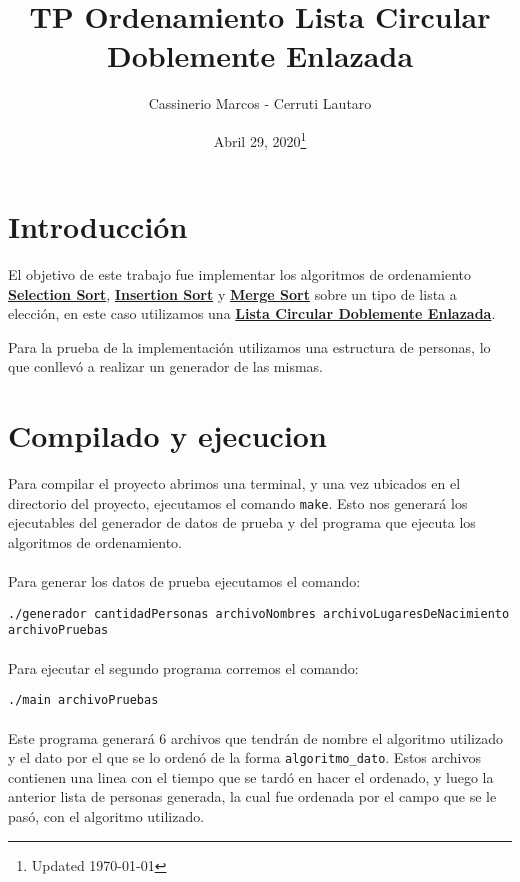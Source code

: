 \documentclass[]{article}
\begin{document}
	
\title{TP Ordenamiento Lista Circular Doblemente Enlazada}
\author{Cassinerio Marcos - Cerruti Lautaro}
\date{Abril 29, 2020\footnote{Updated \today}}
\maketitle
\newpage

\section{Introducción}
El objetivo de este trabajo fue implementar los algoritmos de ordenamiento \href{https://en.wikipedia.org/wiki/Selection_sort}{\textbf{Selection Sort}}, \href{https://en.wikipedia.org/wiki/Insertion_sort}{\textbf{Insertion Sort}} y \href{https://en.wikipedia.org/wiki/Merge_sort}{\textbf{Merge Sort}} sobre un tipo de lista a elección, en este caso utilizamos una \href{https://en.wikipedia.org/wiki/Doubly_linked_list#Circular_doubly_linked_lists}{\textbf{Lista Circular Doblemente Enlazada}}. 

Para la prueba de la implementación utilizamos una estructura de personas, lo que conllevó a realizar un generador de las mismas.

\section{Compilado y ejecucion}
Para compilar el proyecto abrimos una terminal, y una vez ubicados en el directorio del proyecto, ejecutamos el comando \verb|make|. Esto nos generará los ejecutables del generador de datos de prueba y del programa que ejecuta los algoritmos de ordenamiento.\\\\
Para generar los datos de prueba ejecutamos el comando:

\verb|./generador cantidadPersonas archivoNombres archivoLugaresDeNacimiento|\\
\verb|archivoPruebas|
\\
\\
Para ejecutar el segundo programa corremos el comando:

\verb|./main archivoPruebas|
\\\\Este programa generará 6 archivos que tendrán de nombre el algoritmo utilizado y el dato por el que se lo ordenó de la forma \verb|algoritmo_dato|. Estos archivos contienen una linea con el tiempo que se tardó en hacer el ordenado, y luego la anterior lista de personas generada, la cual fue ordenada por el campo que se le pasó, con el algoritmo utilizado. 
\end{document}
